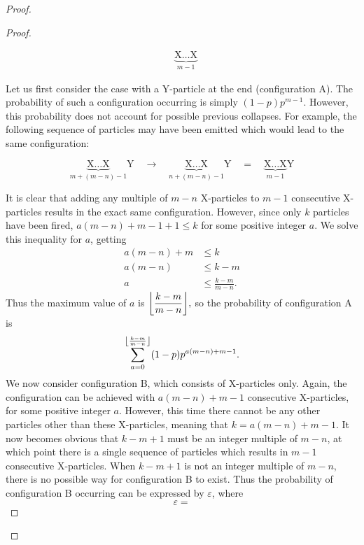 \begin{proof}
\begin{proof}
\begin{figure}[H]
\begin{align*}
        &\underbrace{\text{X}\dots\text{X}}_{m-1} \tag{B}
      \end{align*}
      \vspace{-2em}
    \end{figure}
    Let us first consider the case with a Y-particle at the end (configuration A). The probability of such a configuration occurring is simply $(1-p)p^{m-1}$. However, this probability does not account for possible previous collapses. For example, the following sequence of particles may have been emitted which would lead to the same configuration:
    \begin{figure}[H]
      \vspace{-1.5em}
      \begin{equation*}
        \underbrace{\text{X}\dots\text{X}}_{m + (m-n) - 1}\text{Y} \quad \longrightarrow \quad \underbrace{\text{X}\dots\text{X}}_{n+(m-n)-1}\text{Y}\quad = \quad \underbrace{\text{X}\dots\text{X}}_{m-1}\text{Y} 
      \end{equation*}
      \vspace{-2em}
    \end{figure}
    It is clear that adding any multiple of $m-n$ X-particles to $m-1$ consecutive X-particles results in the exact same configuration. However, since only $k$ particles have been fired, $a(m-n) + m-1 + 1 \le k$ for some positive integer $a$. We solve this inequality for $a$, getting
    \begin{align*}
      a(m-n) + m &\le k \\
      a(m-n) &\le k - m \\
      a &\le \frac{k-m}{m-n}.
    \end{align*}
    Thus the maximum value of $a$ is $\floor*{\dfrac{k-m}{m-n}},$ so the probability of configuration A is \[
      \sum_{a=0}^{\floor*{\frac{k-m}{m-n}}} (1-p)p^{a(m-n)+m-1}
    .\]
    We now consider configuration B, which consists of X-particles only. Again, the configuration can be achieved with $a(m-n) + m-1$ consecutive X-particles, for some positive integer $a$. However, this time there cannot be any other particles other than these X-particles, meaning that  $k = a(m-n) + m-1$. It now becomes obvious that $k-m+1$ must be an integer multiple of $m-n$, at which point there is a single sequence of particles which results in $m-1$ consecutive X-particles. When $k-m+1$ is not an integer multiple of $m-n$, there is no possible way for configuration B to exist. Thus the probability of configuration B occurring can be expressed by $\varepsilon$, where \[
      \varepsilon = 
\]
\end{proof}
\end{proof}
